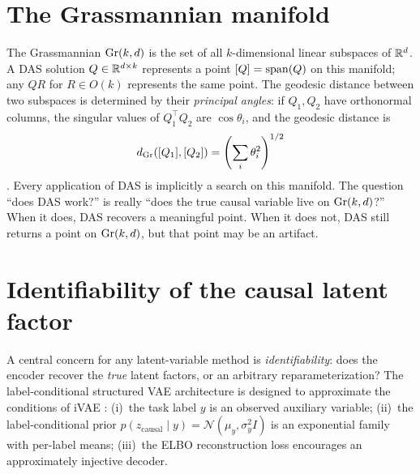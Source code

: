 \section{The Grassmannian manifold}
\label{app:grassmannian}

\label{sec:grassmannian_background}

The Grassmannian $\mathrm{Gr}(k,d)$ is the set of all $k$-dimensional linear subspaces
of $\mathbb{R}^d$. A DAS solution $Q \in \mathbb{R}^{d \times k}$ represents a point
$[Q] = \mathrm{span}(Q)$ on this manifold; any $QR$ for $R \in O(k)$ represents the
same point. The geodesic distance between two subspaces is determined by their
\emph{principal angles}: if $Q_1, Q_2$ have orthonormal columns, the singular
values of $Q_1^\top Q_2$ are $\cos \theta_i$, and the geodesic distance is
\begin{equation}
d_{\mathrm{Gr}}([Q_1],[Q_2]) = \left(\sum_i \theta_i^2\right)^{1/2}
\label{eq:geodesic}
\end{equation}
\citep{edelman1998geometry, absil2008optimization}. Every application of DAS is
implicitly a search on this manifold. The question ``does DAS work?'' is
really ``does the true causal variable live on $\mathrm{Gr}(k,d)$?'' When it does, DAS
recovers a meaningful point. When it does not, DAS still returns a point on
$\mathrm{Gr}(k,d)$, but that point may be an artifact.



\section{Identifiability of the causal latent factor}
\label{app:of}

\label{sec:identifiability}

A central concern for any latent-variable method is \emph{identifiability}:
does the encoder recover the \emph{true} latent factors, or an arbitrary
reparameterization? The label-conditional structured VAE architecture is designed to
approximate the conditions of iVAE \citep{khemakhem2020variational}:
(i)~the task label $y$ is an observed auxiliary variable;
(ii)~the label-conditional prior
$p(z_\text{causal} \mid y) = \mathcal{N}(\mu_y, \sigma_y^2 I)$ is an
exponential family with per-label means; (iii)~the ELBO reconstruction
loss encourages an approximately injective decoder.

